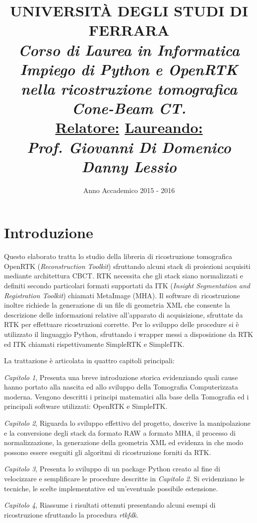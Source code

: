 \documentclass[a4paper,12pt, doubleside]{report}
\title{\textbf{UNIVERSITÀ DEGLI STUDI DI FERRARA\\}
\bigskip
\textit{Corso di Laurea in Informatica}\\
\bigskip
\bigskip
\bigskip
\bigskip
\bigskip
\bigskip
\bigskip
\bigskip
\bigskip
\bigskip
\bigskip
\bigskip
\bigskip
\bigskip
\bigskip
\bigskip
\textit{\textbf{Impiego di Python e OpenRTK nella ricostruzione tomografica Cone-Beam CT.\\}}
\bigskip
\bigskip
\bigskip
\bigskip
\bigskip
\bigskip
\bigskip
\bigskip
\bigskip
\bigskip
\bigskip
\bigskip
\bigskip
\bigskip
\bigskip
\bigskip
\bigskip
\bigskip
\bigskip
\bigskip
\bigskip
\textbf{\underline{Relatore:}}
\hfill
\textbf{\underline{Laureando:}\thinspace\thinspace\thinspace} \\
\textit{Prof. Giovanni Di Domenico}
\hfill
\textit{Danny Lessio}
\bigskip
\bigskip
\bigskip
\bigskip
\bigskip
\bigskip
\bigskip
\bigskip
\bigskip
}
\date{Anno Accademico 2015 - 2016}
\begin{document}
    \maketitle
    \newpage

    \chapter*{Introduzione}
        \par
            Questo elaborato tratta lo studio della libreria di ricostruzione tomografica OpenRTK (\textit{Reconstruction Toolkit}) sfruttando alcuni stack di proiezioni acquisiti mediante architettura CBCT. RTK necessita che gli stack siano normalizzati e definiti secondo particolari formati supportati da ITK (\textit{Insight Segmentation and Registration Toolkit}) chiamati MetaImage (MHA). Il software di ricostruzione inoltre richiede la generazione di un file di geometria XML che consente la descrizione delle informazioni relative all'apparato di acquisizione, sfruttate da RTK per effettuare ricostruzioni corrette. Per lo sviluppo delle procedure si è utilizzato il linguaggio Python, sfruttando i wrapper messi a disposizione da RTK ed ITK chiamati rispettivamente SimpleRTK e SimpleITK.
            
        \bigskip
        \bigskip
        \par
            La trattazione è articolata in quattro capitoli principali:
        \bigskip
        \par
            \textit{Capitolo 1}, Presenta una breve introduzione storica evidenziando quali cause hanno portato alla nascita ed allo sviluppo della Tomografia Computerizzata moderna. Vengono descritti i principi matematici alla base della Tomografia ed i principali software utilizzati: OpenRTK e SimpleITK.
        \bigskip
        \par            
            \textit{Capitolo 2}, Riguarda lo sviluppo effettivo del progetto, descrive la manipolazione e la conversione degli stack da formato RAW a formato MHA, il processo di normalizzazione, la generazione della geometria XML ed evidenza in che modo possono essere eseguiti gli algoritmi di ricostruzione forniti da RTK.
        \bigskip
        \par            
            \textit{Capitolo 3}, Presenta lo sviluppo di un package Python creato al fine di velocizzare e semplificare le procedure descritte in \textit{Capitolo 2}. Si evidenziano le tecniche, le scelte implementative ed un'eventuale possibile estensione.
        \bigskip
        \par            
            \textit{Capitolo 4}, Riassume i risultati ottenuti presentando alcuni esempi di ricostruzione sfruttando la procedura \textit{rtkfdk}.
            
\end{document}
